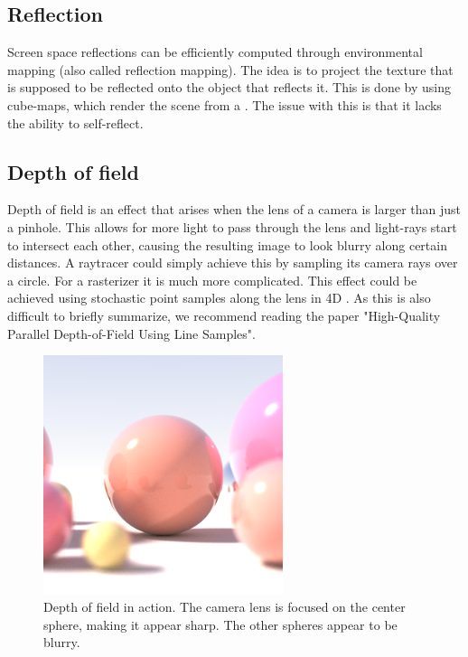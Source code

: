 \documentclass{ACGSeminar}
\begin{document}
	\subsection{Reflection}
		Screen space reflections can be efficiently computed through environmental mapping (also called reflection mapping). The idea is to project the texture that is supposed to be reflected onto the object that reflects it. This is done by using cube-maps, which render the scene from a . The issue with this is that it lacks the ability to self-reflect.

	\subsection{Depth of field}
		Depth of field is an effect that arises when the lens of a camera is larger than just a pinhole. This allows for more light to pass through the lens and light-rays start to intersect each other, causing the resulting image to look blurry along certain distances. A raytracer could simply achieve this by sampling its camera rays over a circle. For a rasterizer it is much more complicated. This effect could be achieved using stochastic point samples along the lens in 4D \cite{DOF2}. As this is also difficult to briefly summarize, we recommend reading the paper "High-Quality Parallel Depth-of-Field Using Line Samples". 
		\begin{figure}[htb!]%
			\begin{center}%
				\includegraphics[width=7cm]{img/raytraced_depth_of_field.png}
			\end{center}%
			\caption{Depth of field in action. The camera lens is focused on the center sphere, making it appear sharp. The other spheres appear to be blurry.}%
			\label{fig:depth_of_field}%
		\end{figure}%
\end{document}

